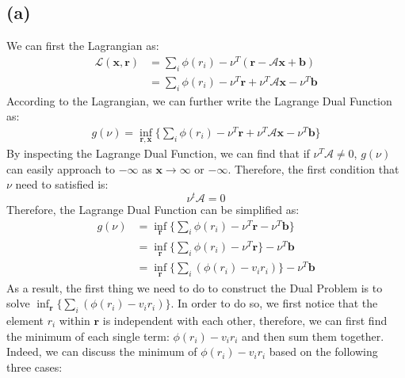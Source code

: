 \documentclass[10pt,a4paper]{article}
\begin{document}
\subsection*{(a)}
We can first the Lagrangian as:
\begin{equation*}
	\begin{aligned}
		\mathcal{L}(\mathbf{x}, \mathbf{r}) &= \displaystyle\sum_{i} \phi(r_{i}) - \nu^{T}(\mathbf{r} - \mathcal{A}\mathbf{x} + \mathbf{b}) \\
		&= \displaystyle\sum_{i} \phi(r_{i}) - \nu^{T} \mathbf{r} + \nu^{T} \mathcal{A} \mathbf{x} - \nu^{T} \mathbf{b}
	\end{aligned}
\end{equation*}
According to the Lagrangian, we can further write the Lagrange Dual Function as:
\begin{equation*}
	\begin{aligned}
		g(\nu) = \displaystyle\inf_{\mathbf{r}, \mathbf{x}} \{ \displaystyle\sum_{i} \phi(r_{i}) - \nu^{T} \mathbf{r} + \nu^{T} \mathcal{A} \mathbf{x} - \nu^{T} \mathbf{b} \}
	\end{aligned}
\end{equation*}
By inspecting the Lagrange Dual Function, we can find that if $\nu^{T} \mathcal{A} \neq 0$, $g(\nu)$ can easily approach to $-\infty$ as $\mathbf{x} \rightarrow \infty$ or $-\infty$. Therefore, the first condition that $\nu$ need to satisfied is:
\begin{equation}
	\nu^{t} \mathcal{A} = 0
\end{equation}
Therefore, the Lagrange Dual Function can be simplified as:
\begin{equation*}
	\begin{aligned}
		g(\nu) &= \displaystyle\inf_{\mathbf{r}} \{ \displaystyle\sum_{i} \phi(r_{i}) - \nu^{T} \mathbf{r} - \nu^{T} \mathbf{b} \} \\
		&= \displaystyle\inf_{\mathbf{r}} \{ \displaystyle\sum_{i} \phi(r_{i}) - \nu^{T} \mathbf{r} \} - \nu^{T} \mathbf{b} \\
		&= \displaystyle\inf_{\mathbf{r}} \{ \displaystyle\sum_{i} (\phi(r_{i}) - v_{i} r_{i}) \} - \nu^{T} \mathbf{b}
	\end{aligned}
\end{equation*}
As a result, the first thing we need to do to construct the Dual Problem is to solve $\displaystyle\inf_{\mathbf{r}} \{ \displaystyle\sum_{i} (\phi(r_{i}) - v_{i} r_{i}) \}$. In order to do so, we first notice that the element $r_{i}$ within $\mathbf{r}$ is independent with each other, therefore, we can first find the minimum of each single term: $\phi(r_{i}) - v_{i} r_{i}$ and then sum them together. Indeed, we can discuss the minimum of $\phi(r_{i}) - v_{i} r_{i}$ based on the following three cases:
\end{document}
